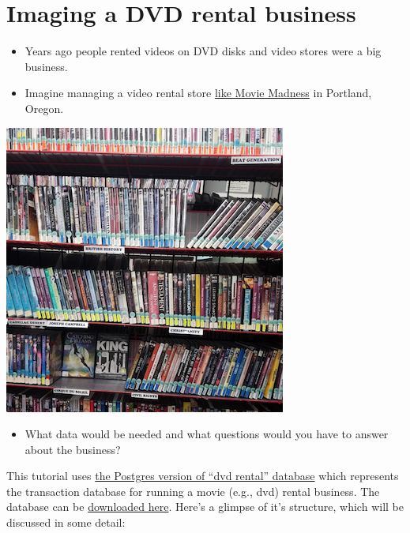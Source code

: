 \documentclass[]{book}
\providecommand{\tightlist}{%
  \setlength{\itemsep}{0pt}\setlength{\parskip}{0pt}}
\theoremstyle{definition}
\theoremstyle{definition}
\theoremstyle{definition}
\theoremstyle{remark}
\begin{document}
\hypertarget{imaging-a-dvd-rental-business}{%
\section{Imaging a DVD rental
business}\label{imaging-a-dvd-rental-business}}

\begin{itemize}
\tightlist
\item
  Years ago people rented videos on DVD disks and video stores were a
  big business.
\item
  Imagine managing a video rental store
  \href{https://en.wikipedia.org/wiki/Movie_Madness_Video}{like Movie
  Madness} in Portland, Oregon.
\end{itemize}

\begin{center}\includegraphics{screenshots/movie-madness-sample} \end{center}

\begin{itemize}
\tightlist
\item
  What data would be needed and what questions would you have to answer
  about the business?
\end{itemize}

This tutorial uses
\href{http://www.postgresqltutorial.com/postgresql-sample-database/}{the
Postgres version of ``dvd rental'' database} which represents the
transaction database for running a movie (e.g., dvd) rental business.
The database can be
\href{http://www.postgresqltutorial.com/wp-content/uploads/2017/10/dvdrental.zip}{downloaded
here}. Here's a glimpse of it's structure, which will be discussed in
some detail:
\end{document}
